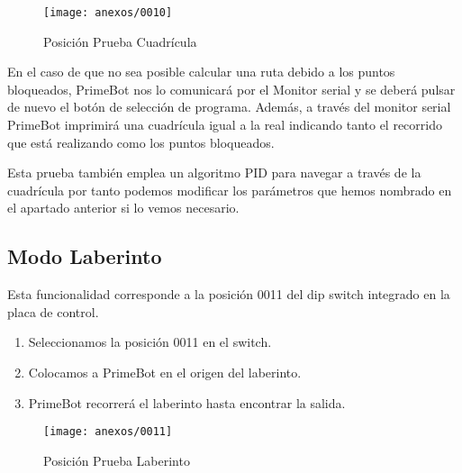 \begin{figure}[h]
	\centering
	\texttt{[image: anexos/0010]}
	\caption{Posición Prueba Cuadrícula}
	\label{fig:E.1}
\end{figure}

En el caso de que no sea posible calcular una ruta debido a los puntos bloqueados, PrimeBot nos lo comunicará por el Monitor serial y se deberá pulsar de nuevo el botón de selección de programa.
Además, a través del monitor serial PrimeBot imprimirá una cuadrícula igual a la real indicando tanto el recorrido que está realizando como los puntos bloqueados.

Esta prueba también emplea un algoritmo PID para navegar a través de la cuadrícula por tanto podemos modificar los parámetros que hemos nombrado en el apartado anterior si lo vemos necesario.

\subsection {Modo Laberinto}
Esta funcionalidad corresponde a la posición 0011 del dip switch integrado en la placa de control.
\begin{enumerate}
\def\labelenumi{\arabic{enumi}.}
\tightlist
\item
Seleccionamos la posición 0011 en el switch.
\item
Colocamos a PrimeBot en el origen del laberinto.
\item
PrimeBot recorrerá el laberinto hasta encontrar la salida.
\end{enumerate}

\begin{figure}[h]
	\centering
	\texttt{[image: anexos/0011]}
	\caption{Posición Prueba Laberinto}
	\label{fig:E.1}
\end{figure}
